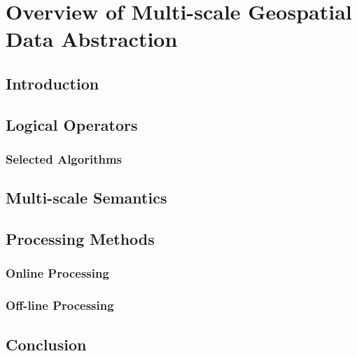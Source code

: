 \chapter{Overview of Multi-scale Geospatial Data Abstraction}

\section{Introduction}

\section{Logical Operators}
\subsection{Selected Algorithms}

\section{Multi-scale Semantics}

\section{Processing Methods}
\subsection{Online Processing}

\subsection{Off-line Processing}

\section{Conclusion}

